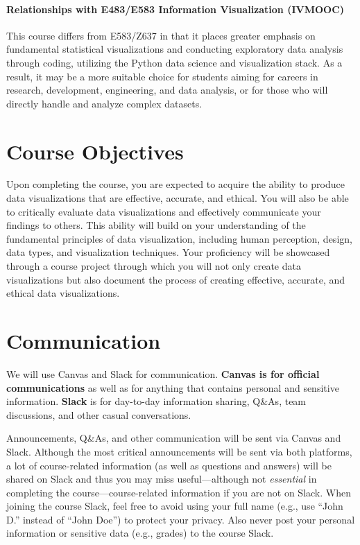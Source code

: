 \documentclass[11pt,article,oneside]{memoir} %
\begin{document}
\paragraph{Relationships with E483/E583 Information Visualization (IVMOOC)} This
course differs from E583/Z637 in that it places greater emphasis on fundamental
statistical visualizations and conducting exploratory data analysis through
coding, utilizing the Python data science and visualization stack. As a result,
it may be a more suitable choice for students aiming for careers in research,
development, engineering, and data analysis, or for those who will directly
handle and analyze complex datasets.

\section{Course Objectives}%

Upon completing the course, you are expected to acquire the ability to produce
data visualizations that are effective, accurate, and ethical.  You will also
be able to critically evaluate data visualizations and effectively communicate
your findings to others.  This ability will build on your understanding of the
fundamental principles of data visualization, including human perception,
design, data types, and visualization techniques.  Your proficiency will be
showcased through a course project through which you will not only create data
visualizations but also document the process of creating effective, accurate,
and ethical data visualizations.

\section{Communication} %

We will use Canvas and Slack for communication. \textbf{Canvas is for official communications} as well as for anything that contains personal and sensitive information. \textbf{Slack} is for day-to-day information sharing, Q\&As, team discussions, and other casual conversations. 

Announcements, Q\&As, and other communication will be sent via Canvas and Slack. Although the most critical announcements will be sent via both platforms, a lot of course-related information (as well as questions and answers) will be shared on Slack and thus you may miss useful---although not \emph{essential} in completing the course---course-related information if you are not on Slack. 
When joining the course Slack, feel free to avoid using your full name (e.g., use ``John D.'' instead of ``John Doe'') to protect your privacy. 
Also never post your personal information or sensitive data (e.g., grades) to the course Slack. 
\end{document}
